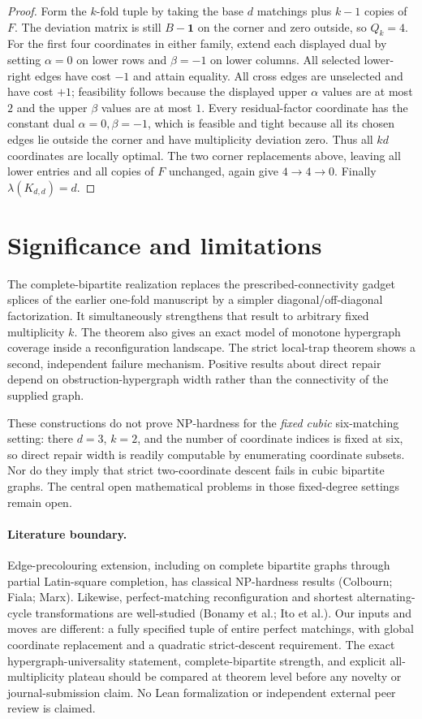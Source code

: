 \documentclass[10pt]{article}
\begin{document}
\begin{proof}
Form the $k$-fold tuple by taking the base $d$ matchings plus $k-1$ copies of $F$. The deviation matrix is still $B-\mathbf1$ on the corner and zero outside, so $Q_k=4$. For the first four coordinates in either family, extend each displayed dual by setting $\alpha=0$ on lower rows and $\beta=-1$ on lower columns. All selected lower-right edges have cost $-1$ and attain equality. All cross edges are unselected and have cost $+1$; feasibility follows because the displayed upper $\alpha$ values are at most $2$ and the upper $\beta$ values are at most $1$. Every residual-factor coordinate has the constant dual $\alpha=0,\beta=-1$, which is feasible and tight because all its chosen edges lie outside the corner and have multiplicity deviation zero. Thus all $kd$ coordinates are locally optimal. The two corner replacements above, leaving all lower entries and all copies of $F$ unchanged, again give $4\to4\to0$. Finally $\lambda(K_{d,d})=d$.
\end{proof}

\section{Significance and limitations}
The complete-bipartite realization replaces the prescribed-connectivity gadget splices of the earlier one-fold manuscript by a simpler diagonal/off-diagonal factorization. It simultaneously strengthens that result to arbitrary fixed multiplicity $k$. The theorem also gives an exact model of monotone hypergraph coverage inside a reconfiguration landscape. The strict local-trap theorem shows a second, independent failure mechanism. Positive results about direct repair depend on obstruction-hypergraph width rather than the connectivity of the supplied graph.

These constructions do not prove NP-hardness for the \emph{fixed cubic} six-matching setting: there $d=3$, $k=2$, and the number of coordinate indices is fixed at six, so direct repair width is readily computable by enumerating coordinate subsets. Nor do they imply that strict two-coordinate descent fails in cubic bipartite graphs. The central open mathematical problems in those fixed-degree settings remain open.

\paragraph{Literature boundary.} Edge-precolouring extension, including on complete bipartite graphs through partial Latin-square completion, has classical NP-hardness results (Colbourn; Fiala; Marx). Likewise, perfect-matching reconfiguration and shortest alternating-cycle transformations are well-studied (Bonamy et al.; Ito et al.). Our inputs and moves are different: a fully specified tuple of entire perfect matchings, with global coordinate replacement and a quadratic strict-descent requirement. The exact hypergraph-universality statement, complete-bipartite strength, and explicit all-multiplicity plateau should be compared at theorem level before any novelty or journal-submission claim. No Lean formalization or independent external peer review is claimed.
\end{document}
